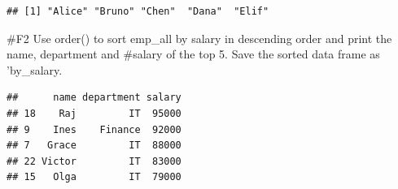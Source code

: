 \documentclass[
]{article}
\newenvironment{Shaded}{\begin{snugshade}}{\end{snugshade}}
\newcommand{\AttributeTok}[1]{\textcolor[rgb]{0.13,0.29,0.53}{#1}}
\newcommand{\ConstantTok}[1]{\textcolor[rgb]{0.56,0.35,0.01}{#1}}
\newcommand{\DecValTok}[1]{\textcolor[rgb]{0.00,0.00,0.81}{#1}}
\newcommand{\FunctionTok}[1]{\textcolor[rgb]{0.13,0.29,0.53}{\textbf{#1}}}
\newcommand{\NormalTok}[1]{#1}
\newcommand{\OtherTok}[1]{\textcolor[rgb]{0.56,0.35,0.01}{#1}}
\newcommand{\SpecialCharTok}[1]{\textcolor[rgb]{0.81,0.36,0.00}{\textbf{#1}}}
\newcommand{\StringTok}[1]{\textcolor[rgb]{0.31,0.60,0.02}{#1}}
\begin{document}
\begin{verbatim}
## [1] "Alice" "Bruno" "Chen"  "Dana"  "Elif"
\end{verbatim}

\#F2 Use order() to sort emp\_all by salary in descending order and
print the name, department and \#salary of the top 5. Save the sorted
data frame as 'by\_salary.

\begin{Shaded}
\end{Shaded}

\begin{verbatim}
##      name department salary
## 18    Raj         IT  95000
## 9    Ines    Finance  92000
## 7   Grace         IT  88000
## 22 Victor         IT  83000
## 15   Olga         IT  79000
\end{verbatim}
\end{document}

